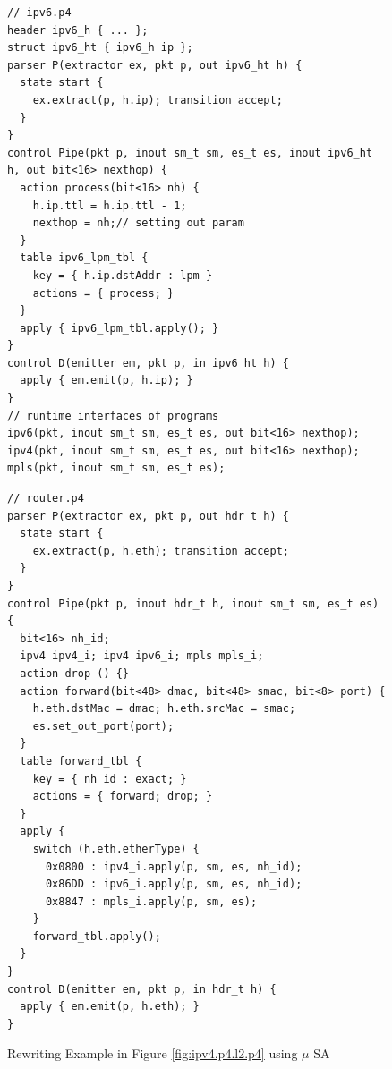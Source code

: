 \begin{figure}
\noindent \begin{minipage}[t]{.50\textwidth}
\begin{lstlisting}[frame=none]
// ipv6.p4
header ipv6_h { ... }; 
struct ipv6_ht { ipv6_h ip };
parser P(extractor ex, pkt p, out ipv6_ht h) {
  state start {
    ex.extract(p, h.ip); transition accept;
  }
}
control Pipe(pkt p, inout sm_t sm, es_t es, inout ipv6_ht h, out bit<16> nexthop) {
  action process(bit<16> nh) {
    h.ip.ttl = h.ip.ttl - 1;
    nexthop = nh;// setting out param
  }
  table ipv6_lpm_tbl {
    key = { h.ip.dstAddr : lpm } 
    actions = { process; }
  }
  apply { ipv6_lpm_tbl.apply(); }
}
control D(emitter em, pkt p, in ipv6_ht h) {
  apply { em.emit(p, h.ip); }
}
// runtime interfaces of programs
ipv6(pkt, inout sm_t sm, es_t es, out bit<16> nexthop);
ipv4(pkt, inout sm_t sm, es_t es, out bit<16> nexthop);
mpls(pkt, inout sm_t sm, es_t es);
\end{lstlisting}
\end{minipage}\hspace{-4pt}\vline
\hfill\begin{minipage}[t]{.50\textwidth}
\begin{lstlisting}[frame=none]
// router.p4
parser P(extractor ex, pkt p, out hdr_t h) {
  state start {
    ex.extract(p, h.eth); transition accept;
  }
}
control Pipe(pkt p, inout hdr_t h, inout sm_t sm, es_t es) {
  bit<16> nh_id;  
  ipv4 ipv4_i; ipv4 ipv6_i; mpls mpls_i;
  action drop () {}           
  action forward(bit<48> dmac, bit<48> smac, bit<8> port) {
    h.eth.dstMac = dmac; h.eth.srcMac = smac;
    es.set_out_port(port);
  }
  table forward_tbl {
    key = { nh_id : exact; } 
    actions = { forward; drop; }
  }
  apply {
    switch (h.eth.etherType) {
      0x0800 : ipv4_i.apply(p, sm, es, nh_id);
      0x86DD : ipv6_i.apply(p, sm, es, nh_id);
      0x8847 : mpls_i.apply(p, sm, es);
    }
    forward_tbl.apply(); 
  }
}
control D(emitter em, pkt p, in hdr_t h) {
  apply { em.emit(p, h.eth); }
}
\end{lstlisting}
\end{minipage}
\caption{Rewriting Example in Figure \ref{fig:ipv4.p4.l2.p4} using $\mu$ SA}
\label{fig:modular-router}
\end{figure}



